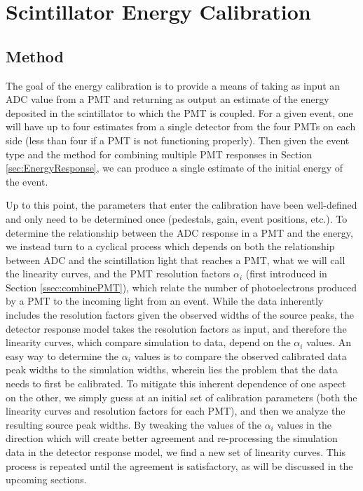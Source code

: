 





\section{Scintillator Energy Calibration}

\subsection{Method}

The goal of the energy calibration is to provide a means of taking as input an ADC value
from a PMT and returning as output an estimate of the energy deposited in the scintillator
to which the PMT is coupled. For a given event, one will have up to four estimates from a
single detector from the four PMTs on each side (less than four if a PMT is not functioning
properly). Then given the event type and the method for combining multiple PMT responses in
Section \ref{sec:EnergyResponse}, we can produce a single estimate of the initial energy of
the event.

Up to this point, the parameters that enter the calibration have been well-defined and only need
to be determined once (pedestals, gain, event positions, etc.). To determine
the relationship between the ADC response in a PMT and the energy, we instead turn to a cyclical process which
depends on both the relationship between ADC and the scintillation light that reaches a PMT,
what we will call the linearity curves, and the
PMT resolution factors $\alpha_i$ (first introduced in Section \ref{ssec:combinePMT}), which relate
the number of photoelectrons produced by a PMT to the incoming light from an event. While the data
inherently includes the resolution factors given the observed widths of the source peaks, the detector
response model takes the resolution factors as input, and therefore the linearity curves, which compare
simulation to data, depend on the $\alpha_i$ values. An easy way to determine the $\alpha_i$ values
is to compare the observed calibrated data peak widths to the simulation widths, wherein lies the problem
that the data needs to first be calibrated. To mitigate this inherent dependence of one aspect on the other,
we simply guess at an initial set of calibration parameters (both the linearity curves and resolution factors
for each PMT), and then we analyze the resulting source peak widths. By tweaking the values of the $\alpha_i$
values in the direction which will create better agreement and re-processing the simulation data in the
detector response model, we find a new set of linearity curves. This process is repeated until the agreement is
satisfactory, as will be discussed in the upcoming sections.

